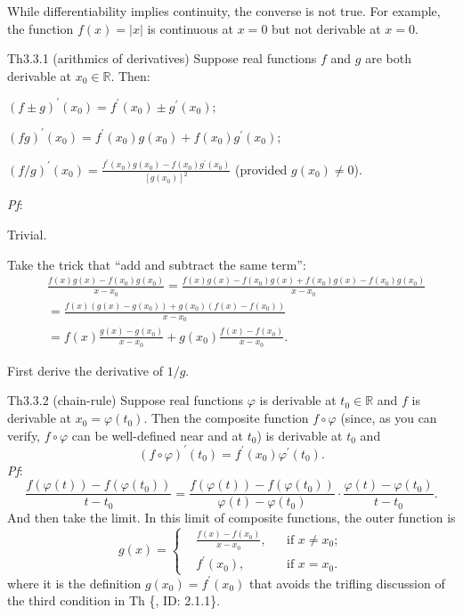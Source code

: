 \documentclass{article}
\begin{document}
\begin{Rmk}{}
    \textcolor{Th}{While differentiability implies continuity, the converse is not true. For example, the function $f(x) = |x|$ is continuous at $x=0$ but not derivable at $x=0$.}
\end{Rmk}

\begin{Th}{Th3.3.1 (arithmics of derivatives)}
    Suppose real functions $f$ and $g$ are both derivable at $x_0\in\mathbb{R}$. Then:
    \begin{compactenum}
        \item $(f\pm g)^\prime(x_0) = f^\prime(x_0) \pm g^\prime(x_0)$;
        \item $(fg)^\prime(x_0) = f^\prime(x_0)g(x_0) + f(x_0)g^\prime(x_0)$;
        \item $(f/g)^\prime(x_0) = \frac{f^\prime(x_0)g(x_0) - f(x_0)g^\prime(x_0)}{[g(x_0)]^2}$ (provided $g(x_0)\neq 0$).
    \end{compactenum}
    \tcblower
    \textit{Pf}:
    \begin{compactenum}
        \item Trivial.
        \item Take the trick that ``add and subtract the same term'':
        $$
        \begin{aligned}
            & \frac{f(x)g(x) - f(x_0)g(x_0)}{x-x_0} = \frac{f(x)g(x) - f(x_0)g(x) + f(x_0)g(x) - f(x_0)g(x_0)}{x-x_0} \\
            &= \frac{f(x)(g(x)-g(x_0)) + g(x_0)(f(x)-f(x_0))}{x-x_0} \\
            &= f(x)\frac{g(x)-g(x_0)}{x-x_0} + g(x_0)\frac{f(x)-f(x_0)}{x-x_0}.
        \end{aligned}
        $$
        \item First derive the derivative of $1/g$.
    \end{compactenum}
\end{Th}

\begin{Th}{Th3.3.2 (chain-rule)}
    Suppose real functions $\varphi$ is derivable at $t_0\in\mathbb{R}$ and $f$ is derivable at $x_0 = \varphi(t_0)$. Then the composite function $f\circ\varphi$ (since, as you can verify, $f\circ\varphi$ can be well-defined near and at $t_0$) is derivable at $t_0$ and 
    $$ (f\circ\varphi)^\prime(t_0) = f^\prime(x_0)\varphi^\prime(t_0). $$
    \tcblower
    \textit{Pf}: $$ \frac{f(\varphi(t))-f(\varphi(t_0))}{t-t_0} = \frac{f(\varphi(t))-f(\varphi(t_0))}{\varphi(t)-\varphi(t_0)}\cdot \frac{\varphi(t)-\varphi(t_0)}{t-t_0}. $$
    And then take the limit. In this limit of composite functions, the outer function is
    $$ g(x) = \left\{
        \begin{aligned}
            &\frac{f(x)-f(x_0)}{x-x_0}, && \text{if } x\neq x_0;\\
            &f^\prime(x_0), && \text{if } x = x_0.
        \end{aligned}\right.
    $$
    where it is the definition $g(x_0) = f^\prime(x_0)$ that avoids the trifling discussion of the third condition in Th \{, ID: 2.1.1\}.
\end{Th}
\end{document}
